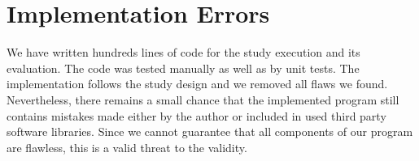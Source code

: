 \section{Implementation Errors}
\label{chp:threats_to_validity:sec:implementation_errors}

We have written hundreds lines of code for the study execution and its evaluation.
The code was tested manually as well as by unit tests.
The implementation follows the study design and we removed all flaws we found.
Nevertheless, there remains a small chance that the implemented program still contains mistakes made either by the author or included in used third party software libraries.
Since we cannot guarantee that all components of our program are flawless, this is a valid threat to the validity.
